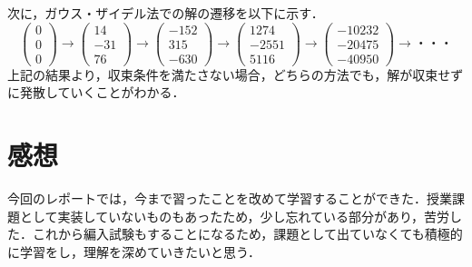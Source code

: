 \documentclass[dvipdfmx,titlepage]{jsarticle}
\begin{document}
次に，ガウス・ザイデル法での解の遷移を以下に示す．
\begin{equation*}
            \left(
                \begin{array}{c}
                    0 \\
                    0 \\
                    0
                \end{array}
            \right) \rightarrow \left(
                \begin{array}{c}
                    14 \\
                    -31 \\
                    76
                \end{array}
            \right) \rightarrow \left(
                \begin{array}{c}
                    -152 \\
                    315 \\
                    -630
                \end{array}
            \right) \rightarrow \left(
                \begin{array}{c}
                    1274 \\
                    -2551 \\
                    5116
                \end{array}
            \right) \rightarrow \left(
                \begin{array}{c}
                    -10232 \\
                    -20475 \\
                    -40950
                \end{array}
            \right)\rightarrow・・・
        \end{equation*}
上記の結果より，収束条件を満たさない場合，どちらの方法でも，解が収束せずに発散していくことがわかる．

\section{感想}
今回のレポートでは，今まで習ったことを改めて学習することができた．授業課題として実装していないものもあったため，少し忘れている部分があり，苦労した．これから編入試験もすることになるため，課題として出ていなくても積極的に学習をし，理解を深めていきたいと思う．
\end{document}
